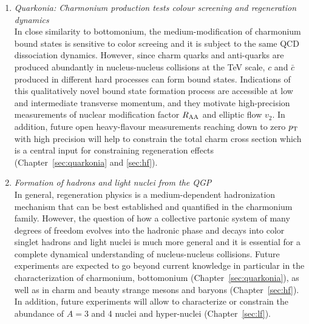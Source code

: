 \documentclass[../report.tex]{subfiles}
\begin{document}
\begin{enumerate}
\item {\it Quarkonia: Charmonium production tests colour screening and regeneration dynamics}\\ In close similarity to bottomonium, the medium-modification of charmonium bound states is sensitive to color screeing and it is subject to the same QCD dissociation dynamics. However, since charm quarks and anti-quarks are produced abundantly in nucleus-nucleus collisions at the TeV scale, $c$ and $\bar c$ produced in different hard processes can form bound states. Indications of this qualitatively novel bound state formation process are accessible at low and intermediate transverse momentum, and they motivate high-precision measurements of nuclear modification factor $R_{\rm AA}$ and elliptic flow $v_2$. In addition, future open heavy-flavour measurements reaching down to zero $p\sb{\scriptstyle\mathrm{T}}$ with high precision will help to constrain the total charm cross section which is a central input for constraining regeneration effects (Chapter~\ref{sec:quarkonia} and \ref{sec:hf}). 
\item {\it Formation of hadrons and light nuclei from the QGP}\\ In general, regeneration physics is a medium-dependent hadronization mechanism that can be best  established and quantified in the charmonium family. However, the question of how a collective partonic system of many degrees of freedom evolves into the hadronic phase and decays into color singlet hadrons and light nuclei is much more general and it is essential for a complete dynamical understanding of nucleus-nucleus collisions. Future experiments are expected to go beyond current knowledge in particular in the characterization of charmonium, bottomonium (Chapter~\ref{sec:quarkonia}), as well as in charm and beauty strange mesons and baryons (Chapter~\ref{sec:hf}). In addition, future experiments will allow to characterize or constrain the abundance of $A=3$ and 4 nuclei and hyper-nuclei (Chapter~\ref{sec:lf}). 
\end{enumerate}
\end{document}
